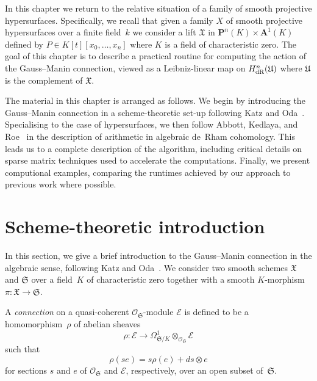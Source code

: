 
In this chapter we return to the relative situation of a family of 
smooth projective hypersurfaces.  Specifically, we recall that given 
a family $X$ of smooth projective hypersurfaces over a finite field~$k$ 
we consider a lift $\mathfrak{X}$ in $\mathbf{P}^n(K) \times \mathbf{A}^1(K)$ 
defined by $P \in K[t][x_0, \dotsc, x_n]$ where $K$ is a field of 
characteristic zero.  The goal of this chapter is to 
describe a practical routine for computing the action of the Gauss--Manin 
connection, viewed as a Leibniz-linear map on $H_{\text{dR}}^n(\mathfrak{U})$ where 
$\mathfrak{U}$ is the complement of $\mathfrak{X}$.

The material in this chapter is arranged as follows.  We begin by introducing 
the Gauss--Manin connection in a scheme-theoretic set-up following Katz and 
Oda~\citep{KatzOda1968}.  Specialising to the case of hypersurfaces, we 
then follow Abbott, Kedlaya, and Roe~\citep{AbbottKedlayaRoe2006} in the 
description of arithmetic in algebraic de~Rham cohomology.  This leads us 
to a complete description of the algorithm, including critical details on 
sparse matrix techniques used to accelerate the computations.  Finally, we 
present computional examples, comparing the runtimes achieved by our approach 
to previous work where possible.


\section{Scheme-theoretic introduction}

In this section, we give a brief introduction to the Gauss--Manin connection 
in the algebraic sense, following Katz and Oda~\citep{KatzOda1968}.  
We consider two smooth schemes $\mathfrak{X}$ and $\mathfrak{S}$ over a 
field~$K$ of characteristic zero together with a smooth $K$-morphism 
$\pi \colon \mathfrak{X} \to \mathfrak{S}$.

\begin{defn}
A \emph{connection} on a quasi-coherent $\mathcal{O}_{\mathfrak{S}}$-module 
$\mathcal{E}$ is defined to be a homomorphism~$\rho$ of abelian sheaves
\begin{equation*}
\rho \colon \mathcal{E} \to 
    \Omega_{\mathfrak{S}/K}^1 \otimes_{\mathcal{O}_{\mathfrak{S}}} \mathcal{E}
\end{equation*}
such that
\begin{equation*}
\rho(s e) = s \rho(e) + ds \otimes e
\end{equation*}
for sections $s$ and $e$ of $\mathcal{O}_{\mathfrak{S}}$ and $\mathcal{E}$, 
respectively, over an open subset of~$\mathfrak{S}$.
\end{defn}


